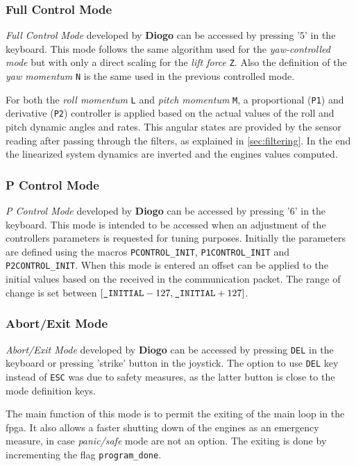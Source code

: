 \documentclass{article}
\begin{document}
\subsubsection{Full Control Mode}
\textit{Full Control Mode} developed by \textbf{Diogo} can be accessed by pressing '$5$' in the keyboard. This mode follows the same algorithm used for the \textit{yaw-controlled mode} but with only a direct scaling for the \textit{lift force} \texttt{Z}. Also the definition of the \textit{yaw momentum} \texttt{N} is the same used in the previous controlled mode. 

For both the \textit{roll momentum} \texttt{L} and \textit{pitch momentum} \texttt{M}, a proportional (\texttt{P1}) and derivative (\texttt{P2}) controller is applied based on the actual values of the roll and pitch dynamic angles and rates. This angular states are provided by the sensor reading after passing through the filters, as explained in \ref{sec:filtering}. In the end the linearized system dynamics are inverted and the engines values computed.

\subsubsection{P Control Mode}
\textit{P Control Mode} developed by \textbf{Diogo} can be accessed by pressing '$6$' in the keyboard. This mode is intended to be accessed when an adjustment of the controllers parameters is requested for tuning purposes. Initially the parameters are defined using the macros \texttt{PCONTROL\_INIT}, \texttt{P1CONTROL\_INIT} and \texttt{P2CONTROL\_INIT}. When this mode is entered an offset can be applied to the initial values based on the received in the communication packet. The range of change is set between $[\text{\texttt{\_INITIAL}}-127,\text{\texttt{\_INITIAL}}+127]$.

\subsubsection{Abort/Exit Mode}
\textit{Abort/Exit Mode} developed by \textbf{Diogo} can be accessed by pressing \texttt{DEL} in the keyboard or pressing 'strike' button in the joystick. The option to use \texttt{DEL} key instead of \texttt{ESC} was due to safety measures, as the latter button is close to the mode definition keys. 

The main function of this mode is to permit the exiting of the main loop in the fpga. It also allows a faster shutting down of the engines as an emergency measure, in case \textit{panic/safe} mode are not an option. The exiting is done by incrementing the flag \texttt{program\_done}.
\end{document}
